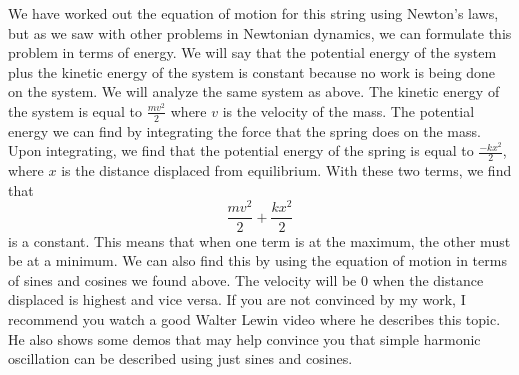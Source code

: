 \documentclass{article}[gray]
\numberwithin{equation}{subsection}
\begin{document}
We have worked out the equation of motion for this string using Newton’s laws, but as we saw with other problems in Newtonian dynamics, we can formulate this problem in terms of energy. We will say that the potential energy of the system plus the kinetic energy of the system is constant because no work is being done on the system.  We will analyze the same system as above. The kinetic energy of the system is equal to $\frac{mv^2}{2}$ where $v$ is the velocity of the mass. The potential energy we can find by integrating the force that the spring does on the mass. Upon integrating, we find that the potential energy of the spring is equal to $\frac{-kx^2}{2}$, where $x$ is the distance displaced from equilibrium. With these two terms, we find that $$\frac{mv^2}{2}+\frac{kx^2}{2}$$ is a constant. This means that when one term is at the maximum, the other must be at a minimum. We can also find this by using the equation of motion in terms of sines and cosines we found above. The velocity will be 0 when the distance displaced is highest and vice versa. If you are not convinced by my work, I recommend you watch a good Walter Lewin video where he describes this topic. He also shows some demos that may help convince you that simple harmonic oscillation can be described using just sines and cosines. 
\end{document}
